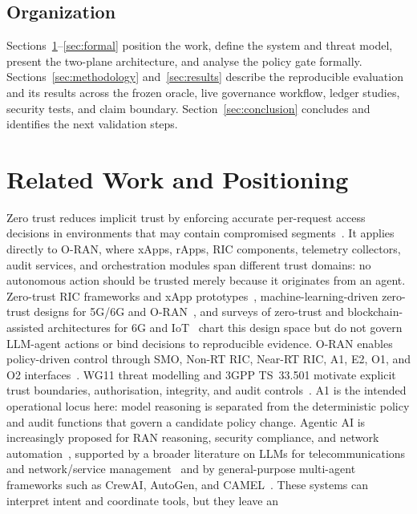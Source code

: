 \documentclass[journal]{IEEEtran}
\begin{document}
\subsection{Organization}
Sections~\ref{sec:related}--\ref{sec:formal} position the work, define the
system and threat model, present the two-plane architecture, and analyse the
policy gate formally. Sections~\ref{sec:methodology} and~\ref{sec:results}
describe the reproducible evaluation and its results across the frozen oracle,
live governance workflow, ledger studies, security tests, and claim boundary.
Section~\ref{sec:conclusion} concludes and identifies the next validation steps.
\section{Related Work and Positioning}
\label{sec:related}
Zero trust reduces implicit trust by enforcing accurate per-request access
decisions in environments that may contain compromised
segments~\cite{nistZeroTrust}. It applies directly to O-RAN, where xApps,
rApps, RIC components, telemetry collectors, audit services, and orchestration
modules span different trust domains: no autonomous action should be trusted
merely because it originates from an agent. Zero-trust RIC frameworks and
xApp prototypes~\cite{lin2025ztric,abdalla2024ztran}, machine-learning-driven
zero-trust designs for 5G/6G and O-RAN~\cite{ramezanpour2022izta}, and
surveys of zero-trust and blockchain-assisted architectures for 6G and
IoT~\cite{nahar2024zta,aleisa2025blockchain} chart this design space but do
not govern LLM-agent actions or bind decisions to reproducible evidence.
O-RAN enables policy-driven control through SMO, Non-RT RIC, Near-RT RIC,
A1, E2, O1, and O2 interfaces~\cite{oranArchitecture,oranSecReq,oranSecProtocols}.
WG11 threat modelling and 3GPP TS~33.501 motivate explicit trust boundaries,
authorisation, integrity, and audit controls~\cite{oranThreatModel,threegpp33501}.
A1 is the intended operational locus here: model reasoning is separated from
the deterministic policy and audit functions that govern a candidate policy
change.
Agentic AI is increasingly proposed for RAN reasoning, security compliance,
and network automation~\cite{chatzimiltis2026,he2026agentic,elkael2025agentran,navidan2026},
supported by a broader literature on LLMs for telecommunications and
network/service management~\cite{zhou2025llmtelecom,boateng2025llm,long2025llmops}
and by general-purpose multi-agent frameworks such as CrewAI, AutoGen, and
CAMEL~\cite{crewaiDocs,wu2023autogen,li2023camel}.
These systems can interpret intent and coordinate tools, but they leave an
\end{document}
